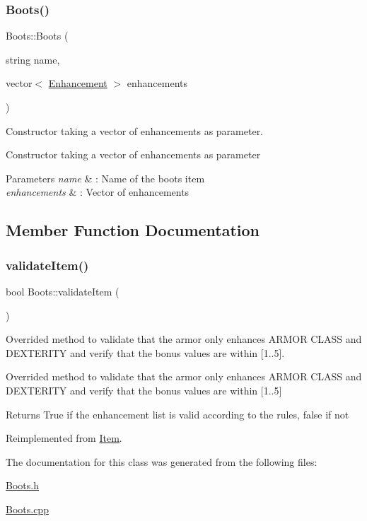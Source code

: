 \subsubsection{\texorpdfstring{Boots()}{Boots()}\hspace{0.1cm}{\footnotesize\ttfamily [2/2]}}
{\footnotesize\ttfamily Boots\+::\+Boots (\begin{DoxyParamCaption}\item[{string}]{name,  }\item[{vector$<$ \hyperlink{class_enhancement}{Enhancement} $>$}]{enhancements }\end{DoxyParamCaption})}



Constructor taking a vector of enhancements as parameter. 

Constructor taking a vector of enhancements as parameter 
\begin{DoxyParams}{Parameters}
{\em name} & \+: Name of the boots item \\
\hline
{\em enhancements} & \+: Vector of enhancements \\
\hline
\end{DoxyParams}


\subsection{Member Function Documentation}
\hypertarget{class_boots_aac6123a5f117993f276eb5f2f343eeb0}{}\label{class_boots_aac6123a5f117993f276eb5f2f343eeb0} 
\subsubsection{\texorpdfstring{validate\+Item()}{validateItem()}}
{\footnotesize\ttfamily bool Boots\+::validate\+Item (\begin{DoxyParamCaption}{ }\end{DoxyParamCaption})\hspace{0.3cm}{\ttfamily [virtual]}}



Overrided method to validate that the armor only enhances \textquotesingle{}A\+R\+M\+OR C\+L\+A\+SS\textquotesingle{} and \textquotesingle{}D\+E\+X\+T\+E\+R\+I\+TY\textquotesingle{} and verify that the bonus values are within \mbox{[}1..5\mbox{]}. 

Overrided method to validate that the armor only enhances \textquotesingle{}A\+R\+M\+OR C\+L\+A\+SS\textquotesingle{} and \textquotesingle{}D\+E\+X\+T\+E\+R\+I\+TY\textquotesingle{} and verify that the bonus values are within \mbox{[}1..5\mbox{]} \begin{DoxyReturn}{Returns}
True if the enhancement list is valid according to the rules, false if not 
\end{DoxyReturn}


Reimplemented from \hyperlink{class_item_a6603371b60aaded48f697975c81fc25b}{Item}.



The documentation for this class was generated from the following files\+:\begin{DoxyCompactItemize}
\item 
\hyperlink{_boots_8h}{Boots.\+h}\item 
\hyperlink{_boots_8cpp}{Boots.\+cpp}\end{DoxyCompactItemize}
